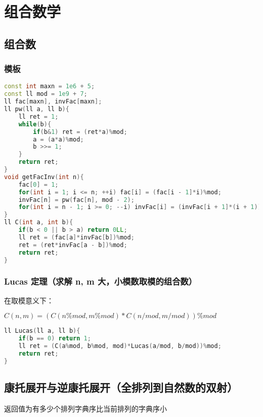 

\section{组合数学}

\subsection{组合数}

\subsubsection{模板}

\begin{lstlisting}[language=C++]
const int maxn = 1e6 + 5;
const ll mod = 1e9 + 7;
ll fac[maxn], invFac[maxn];
ll pw(ll a, ll b){
    ll ret = 1;
    while(b){
        if(b&1) ret = (ret*a)%mod;
        a = (a*a)%mod;
        b >>= 1;
    }
    return ret;
}
void getFacInv(int n){
    fac[0] = 1;
    for(int i = 1; i <= n; ++i) fac[i] = (fac[i - 1]*i)%mod;
    invFac[n] = pw(fac[n], mod - 2);
    for(int i = n - 1; i >= 0; --i) invFac[i] = (invFac[i + 1]*(i + 1))%mod;
}
ll C(int a, int b){
    if(b < 0 || b > a) return 0LL;
    ll ret = (fac[a]*invFac[b])%mod;
    ret = (ret*invFac[a - b])%mod;
    return ret;
}
\end{lstlisting}

\subsubsection{Lucas 定理（求解 n, m 大，小模数取模的组合数）}

在取模意义下：

$C(n,m) = (C(n\%mod,m\%mod)*C(n/mod,m/mod))\%mod$

\begin{lstlisting}[language=C++]
ll Lucas(ll a, ll b){
    if(b == 0) return 1;
    ll ret = (C(a%mod, b%mod, mod)*Lucas(a/mod, b/mod))%mod;
    return ret;
}
\end{lstlisting}

\subsection{康托展开与逆康托展开（全排列到自然数的双射）}

返回值为有多少个排列字典序比当前排列的字典序小

